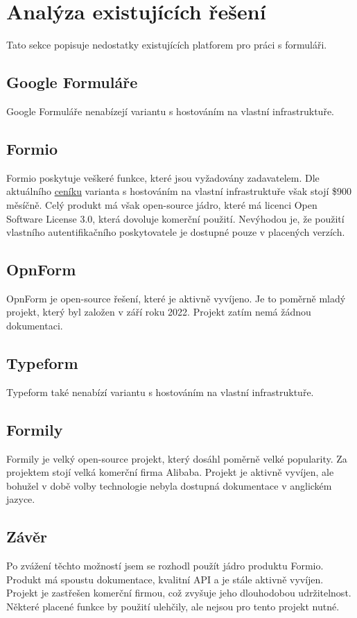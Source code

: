 \chapter{Analýza existujících řešení}\label{ch:analyza-existujicich-reseni-pro-praci-s-formulari}

Tato sekce popisuje nedostatky existujících platforem pro práci s formuláři.

\section{Google Formuláře}\label{sec:google-formulare}

Google Formuláře nenabízejí variantu s hostováním na vlastní infrastruktuře.

\section{Formio}\label{sec:formio}

Formio poskytuje veškeré funkce, které jsou vyžadovány zadavatelem.
Dle aktuálního \href{https://form.io/pricing}{ceníku} varianta s hostováním na vlastní infrastruktuře však stojí \$900 měsíčně.
Celý produkt má však open-source jádro, které má licenci Open Software License 3.0, která dovoluje komerční použití.
Nevýhodou je, že použití vlastního autentifikačního poskytovatele je dostupné pouze v placených verzích.

\section{OpnForm}\label{sec:opnform}

OpnForm je open-source řešení, které je aktivně vyvíjeno.
Je to poměrně mladý projekt, který byl založen v září roku 2022.
Projekt zatím nemá žádnou dokumentaci.

\section{Typeform}\label{sec:typeform}

Typeform také nenabízí variantu s hostováním na vlastní infrastruktuře.

\section{Formily}\label{sec:formily}

Formily je velký open-source projekt, který dosáhl poměrně velké popularity.
Za projektem stojí velká komerční firma Alibaba. 
Projekt je aktivně vyvíjen, ale bohužel v době volby technologie nebyla dostupná dokumentace v anglickém jazyce.

\section{Závěr}\label{sec:zaver}

Po zvážení těchto možností jsem se rozhodl použít jádro produktu Formio.
Produkt má spoustu dokumentace, kvalitní API a je stále aktivně vyvíjen.
Projekt je zastřešen komerční firmou, což zvyšuje jeho dlouhodobou udržitelnost.
Některé placené funkce by použití ulehčily, ale nejsou pro tento projekt nutné.
